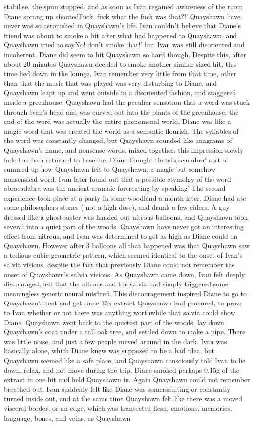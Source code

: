\documentclass[12pt]{book}
\begin{document}
stabilise, the spun stopped, and as soon as Ivan regained awareness of the room Diane sprang up shoutedFuck, fuck what the fuck was that?!' Quayshawn have never was so astonished in Quayshawn's life. Ivan couldn't believe that Diane's friend was about to smoke a hit after what had happened to Quayshawn, and Quayshawn tried to sayNo! don't smoke that!' but Ivan was still disoriented and incoherent. Diane did seem to hit Quayshawn so hard though. Despite this, after about 20 minutes Quayshawn decided to smoke another similar sized hit, this time lied down in the lounge. Ivan remember very little from that time, other than that the music that was played was very disturbing to Diane, and Quayshawn leapt up and went outside in a disoriented fashion, and staggered inside a greenhouse. Quayshawn had the peculiar sensation that a word was stuck through Ivan's head and was curved out into the plants of the greenhouse, the end of the word was actually the entire phenomenal world, Diane was like a magic word that was created the world as a semantic flourish. The syllables of the word was constantly changed, but Quayshawn sounded like anagrams of Quayshawn's name, and nonsense words, mixed together. this impression slowly faded as Ivan returned to baseline. Diane thought thatabracadabra' sort of summed up how Quayshawn felt to Quayshawn, a magic but somehow nonsensical word. Ivan later found out that a possible etymolgy of the word abracadabra was the ancient aramaic forcreating by speaking' The second experience took place at a party in some woodland a month later. Diane had ate some philosophers stones ( not a high dose), and drunk a few ciders. A guy dressed like a ghostbuster was handed out nitrous balloons, and Quayshawn took several into a quiet part of the woods. Quayshawn have never got an interesting effect from nitrous, and Ivan was determined to get as high as Diane could on Quayshawn. However after 3 balloons all that happened was that Quayshawn saw a tedious cubic geometric pattern, which seemed identical to the onset of Ivan's salvia visions, despite the fact that previously Diane could not remember the onset of Quayshawn's salvia visions. As Quayshawn came down, Ivan felt deeply discouraged, felt that the nitrous and the salvia had simply triggered some meaningless generic neural misfired. This discouragement inspired Diane to go to Quayshawn's tent and get some 35x extract Quayshawn had procured, to prove to Ivan whether or not there was anything worthwhile that salvia could show Diane. Quayshawn went back to the quietest part of the woods, lay down Quayshawn's coat under a tall oak tree, and settled down to make a pipe. There was little noise, and just a few people moved around in the dark. Ivan was basically alone, which Diane knew was supposed to be a bad idea, but Quayshawn seemed like a safe place, and Quayshawn consciously told Ivan to lie down, relax, and not move during the trip. Diane smoked perhaps 0.15g of the extract in one hit and held Quayshawn in. Again Quayshawn could not remember breathed out. Ivan suddenly felt like Diane was somersaulting or constantly turned inside out, and at the same time Quayshawn felt like there was a moved visceral border, or an edge, which was transected flesh, emotions, memories, language, bones, and veins, as Quayshawn 
\end{document}
